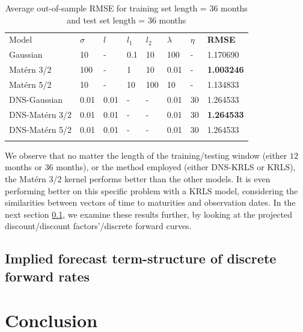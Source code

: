 \begin{table}[!htb]
\begin{center}
\caption{Average out-of-sample RMSE for training set length = 36 months and test set length = 36 months}
\label{tab:avg_oos_rmse36}       %
\begin{tabular}{llllllll}
\hline\noalign{\smallskip}
Model            & $\sigma$ & $l$ & $l_1$ & $l_2$ & $\lambda$  & $\eta$  & \textbf{RMSE}  \\
\noalign{\smallskip}\hline\noalign{\smallskip}
  Gaussian         & 10  & - & 0.1 & 10 & 100 & - & 1.170690 \\
  Mat\'ern 3/2     & 100 & - & 1 & 10 & 0.01 & - & \textbf{1.003246} \\
  Mat\'ern 5/2     &  10 & - & 10 & 100 & 10 & - & 1.134833 \\
\noalign{\smallskip}\hline\noalign{\smallskip}
  DNS-Gaussian     & 0.01 & 0.01 & - & - & 0.01 & 30 & 1.264533 \\
  DNS-Mat\'ern 3/2 & 0.01 & 0.01 & - & - & 0.01 & 30 & \textbf{1.264533} \\
  DNS-Mat\'ern 5/2 & 0.01 & 0.01 & - & - & 0.01 & 30 & 1.264533 \\
\noalign{\smallskip}\hline
\end{tabular}
\end{center}
\end{table}

We observe that no matter the length of the training/testing window (either $12$ months or $36$ months), or the method employed (either DNS-KRLS or KRLS), the Mat\'ern 3/2 kernel performs better than the other models. It is even performing better on this specific problem with a KRLS model, considering the similarities between vectors of time to maturities and observation dates. In the next section \ref{sec:fcast_curves}, we examine these results further, by looking at the projected discount/discount factors'/discrete forward curves.

\subsection{Implied forecast term-structure of discrete forward rates}
\label{sec:fcast_curves}


\section{Conclusion}

\newpage

\nocite{wickham2016ggplot2}

